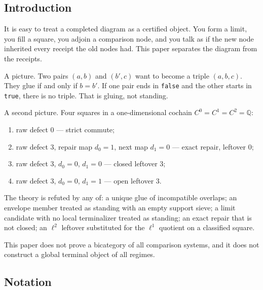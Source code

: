 \documentclass[
  11pt,
]{article}
\providecommand{\tightlist}{%
  \setlength{\itemsep}{0pt}\setlength{\parskip}{0pt}}
\begin{document}
\subsection{Introduction}\label{introduction}

It is easy to treat a completed diagram as a certified object. You form a limit, you fill a square, you adjoin a comparison node, and you talk as if the new node inherited every receipt the old nodes had. This paper separates the diagram from the receipts.

A picture. Two pairs \((a,b)\) and \((b',c)\) want to become a triple \((a,b,c)\). They glue if and only if \(b=b'\). If one pair ends in \texttt{false} and the other starts in \texttt{true}, there is no triple. That is gluing, not standing.

A second picture. Four squares in a one-dimensional cochain \(C^0=C^1=C^2=\mathbb{Q}\):

\begin{enumerate}
\def\labelenumi{\arabic{enumi}.}
\tightlist
\item
  raw defect \(0\) --- strict commute;
\item
  raw defect \(3\), repair map \(d_0=1\), next map \(d_1=0\) --- exact repair, leftover \(0\);
\item
  raw defect \(3\), \(d_0=0\), \(d_1=0\) --- closed leftover \(3\);
\item
  raw defect \(3\), \(d_0=0\), \(d_1=1\) --- open leftover \(3\).
\end{enumerate}

The theory is refuted by any of: a unique glue of incompatible overlaps; an envelope member treated as standing with an empty support sieve; a limit candidate with no local terminalizer treated as standing; an exact repair that is not closed; an \(\ell^2\) leftover substituted for the \(\ell^1\) quotient on a classified square.

This paper does not prove a bicategory of all comparison systems, and it does not construct a global terminal object of all regimes.

\subsection{Notation}\label{notation}
\end{document}
